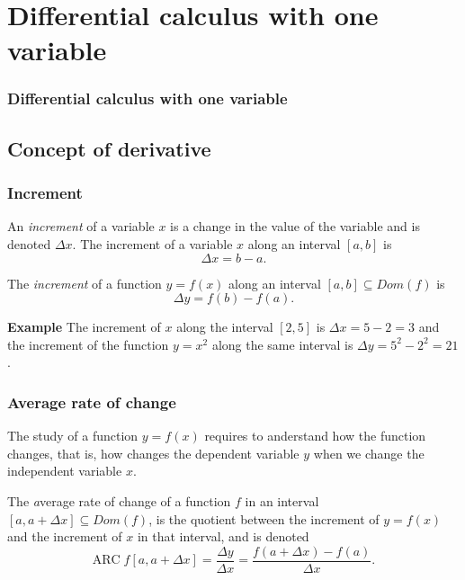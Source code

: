 \section{Differential calculus with one variable}
\begin{frame}
\frametitle{Differential calculus with one variable}
\tableofcontents[sectionstyle=show/hide,hideothersubsections]
\end{frame}


\subsection{Concept of derivative}
\begin{frame}
\frametitle{Increment}
\begin{definition}
An \emph{increment} of a variable $x$ is a change in the value of the variable and is denoted $\Delta x$.
The increment of a variable $x$ along an interval $[a,b]$ is
\[
\Delta x = b-a.
\]
\end{definition}

\begin{definition}
The \emph{increment} of a function $y=f(x)$ along an interval $[a,b]\subseteq Dom(f)$ is
\[
\Delta y = f(b)-f(a).
\]
\end{definition}

\textbf{Example} The increment of $x$ along the interval $[2,5]$ is $\Delta x=5-2=3$ and the increment of the function $y=x^2$ along the same interval is $\Delta y=5^2-2^2=21$.
\end{frame}

\begin{frame}
\frametitle{Average rate of change}
The study of a function $y=f(x)$ requires to anderstand how the function changes, that is, how changes the dependent variable $y$ when we change the independent variable $x$.

\begin{definition}
The  \emph average rate of change of a function $f$ in an interval $[a,a+\Delta x]\subseteq Dom(f)$, is the quotient between the increment of $y=f(x)$ and the increment of $x$ in that interval, and is denoted
\[
\mbox{ARC}\;f[a,a+\Delta x]=\frac{\Delta y}{\Delta x}=\frac{f(a+\Delta x)-f(a)}{\Delta x}.
\]
\end{definition}
\end{frame}

